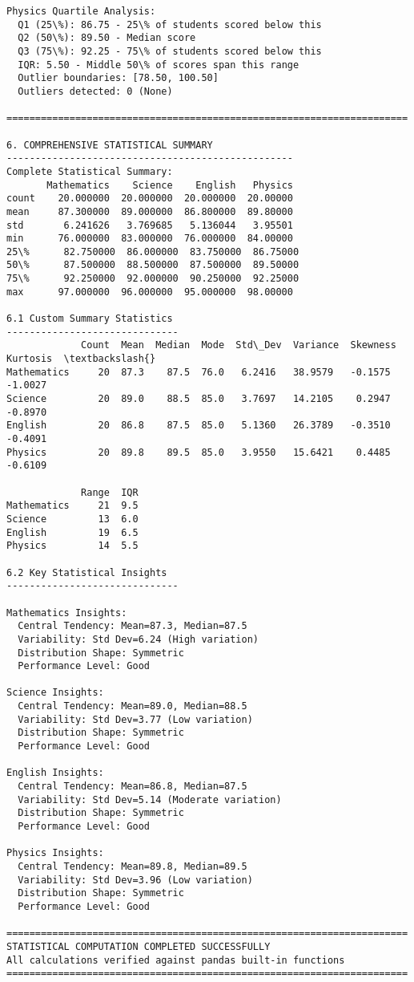 \documentclass[11pt]{article}
\begin{document}
\begin{Verbatim}[commandchars=\\\{\}]
Physics Quartile Analysis:
  Q1 (25\%): 86.75 - 25\% of students scored below this
  Q2 (50\%): 89.50 - Median score
  Q3 (75\%): 92.25 - 75\% of students scored below this
  IQR: 5.50 - Middle 50\% of scores span this range
  Outlier boundaries: [78.50, 100.50]
  Outliers detected: 0 (None)

======================================================================

6. COMPREHENSIVE STATISTICAL SUMMARY
--------------------------------------------------
Complete Statistical Summary:
       Mathematics    Science    English   Physics
count    20.000000  20.000000  20.000000  20.00000
mean     87.300000  89.000000  86.800000  89.80000
std       6.241626   3.769685   5.136044   3.95501
min      76.000000  83.000000  76.000000  84.00000
25\%      82.750000  86.000000  83.750000  86.75000
50\%      87.500000  88.500000  87.500000  89.50000
75\%      92.250000  92.000000  90.250000  92.25000
max      97.000000  96.000000  95.000000  98.00000

6.1 Custom Summary Statistics
------------------------------
             Count  Mean  Median  Mode  Std\_Dev  Variance  Skewness  Kurtosis  \textbackslash{}
Mathematics     20  87.3    87.5  76.0   6.2416   38.9579   -0.1575   -1.0027
Science         20  89.0    88.5  85.0   3.7697   14.2105    0.2947   -0.8970
English         20  86.8    87.5  85.0   5.1360   26.3789   -0.3510   -0.4091
Physics         20  89.8    89.5  85.0   3.9550   15.6421    0.4485   -0.6109

             Range  IQR
Mathematics     21  9.5
Science         13  6.0
English         19  6.5
Physics         14  5.5

6.2 Key Statistical Insights
------------------------------

Mathematics Insights:
  Central Tendency: Mean=87.3, Median=87.5
  Variability: Std Dev=6.24 (High variation)
  Distribution Shape: Symmetric
  Performance Level: Good

Science Insights:
  Central Tendency: Mean=89.0, Median=88.5
  Variability: Std Dev=3.77 (Low variation)
  Distribution Shape: Symmetric
  Performance Level: Good

English Insights:
  Central Tendency: Mean=86.8, Median=87.5
  Variability: Std Dev=5.14 (Moderate variation)
  Distribution Shape: Symmetric
  Performance Level: Good

Physics Insights:
  Central Tendency: Mean=89.8, Median=89.5
  Variability: Std Dev=3.96 (Low variation)
  Distribution Shape: Symmetric
  Performance Level: Good

======================================================================
STATISTICAL COMPUTATION COMPLETED SUCCESSFULLY
All calculations verified against pandas built-in functions
======================================================================
    \end{Verbatim}
\end{document}

